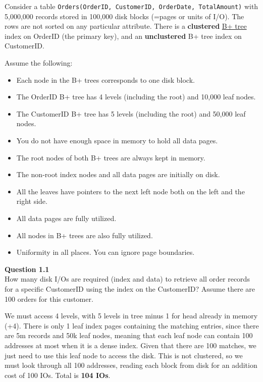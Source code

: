   \begin{example}
    \label{ex:index-problem}
    Consider a table \texttt{Orders(OrderID, CustomerID, OrderDate, TotalAmount)} with 5,000,000 records stored in 100,000 disk blocks (=pages or units of I/O). The rows are not sorted on any particular attribute. There is a \textbf{clustered} \hyperref[def:b-tree-2]{B+ tree} index on OrderID (the primary key), and an \textbf{unclustered} B+ tree index on CustomerID.

    Assume the following:
    \begin{itemize}
      \item Each node in the B+ trees corresponds to one disk block.
      \item The OrderID B+ tree has 4 levels (including the root) and 10,000 leaf nodes.
      \item The CustomerID B+ tree has 5 levels (including the root) and 50,000 leaf nodes.
      \item You do not have enough space in memory to hold all data pages.
      \item The root nodes of both B+ trees are always kept in memory.
      \item The non-root index nodes and all data pages are initially on disk.
      \item All the leaves have pointers to the next left node both on the left and the right side.
      \item All data pages are fully utilized.
      \item All nodes in B+ trees are also fully utilized.
      \item Uniformity in all places. You can ignore page boundaries.
    \end{itemize}

    \noindent\textbf{Question 1.1}\\
    How many disk I/Os are required (index and data) to retrieve all order records for a specific CustomerID using the index on the CustomerID? Assume there are 100 orders for this customer.

    We must access 4 levels, with 5 levels in tree minus 1 for head already in memory (+4). There is only 1 leaf index pages containing the matching entries, since there are 5m records and 50k leaf nodes, meaning that each leaf node can contain 100 addresses at most when it is a dense index. Given that there are 100 matches, we just need to use this leaf node to access the disk. This is not clustered, so we must look through all 100 addresses, reading each block from disk for an addition cost of 100 IOs. Total is \textbf{104 IOs}. 


\end{example}
